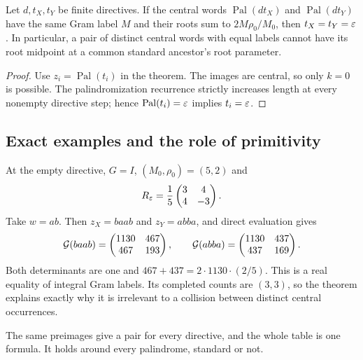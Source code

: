 \begin{corollary}
\label{cor:no-central-midpoint}
Let $d,t_X,t_Y$ be finite directives. If the central words
$\operatorname{Pal}(dt_X)$ and $\operatorname{Pal}(dt_Y)$ have the
same Gram label $M$ and their roots sum to $2M\rho_0/M_0$, then
$t_X=t_Y=\varepsilon$. In particular, a pair of distinct central words
with equal labels cannot have its root midpoint at a common
standard ancestor's root parameter.
\end{corollary}

\begin{proof}
Use $z_i=\operatorname{Pal}(t_i)$ in the theorem. The images are
central, so only $k=0$ is possible. The palindromization recurrence
strictly increases length at every nonempty directive step; hence
$\operatorname{Pal}(t_i)=\varepsilon$ implies $t_i=\varepsilon$.
\end{proof}

\subsection{Exact examples and the role of primitivity}

At the empty directive, $G=I$, $(M_0,\rho_0)=(5,2)$ and
$$
 R_\varepsilon=\frac15\begin{pmatrix}3&4\\4&-3\end{pmatrix}.
$$
Take $w=ab$. Then $z_X=baab$ and $z_Y=abba$, and direct evaluation gives
\begin{equation}\label{eq:small-gram-pair}
 \mathcal{G}(baab)=\begin{pmatrix}1130&467\\467&193\end{pmatrix},
 \qquad
 \mathcal{G}(abba)=\begin{pmatrix}1130&437\\437&169\end{pmatrix}.
\end{equation}
Both determinants are one and
$467+437=2\cdot1130\cdot(2/5)$.
This is a real equality of integral Gram labels. Its completed
counts are $(3,3)$, so the theorem explains exactly why it is
irrelevant to a collision between distinct central occurrences.

The same preimages give a pair for every directive, and the whole table
is one formula. It holds around every palindrome, standard or not.


